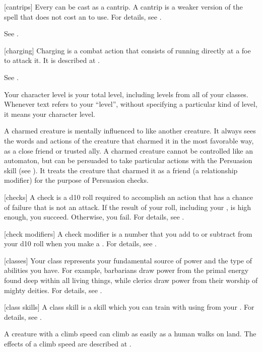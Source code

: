 [cantrips] Every  can be cast as a cantrip.
A cantrip is a weaker version of the spell that does not cost an  to use.
For details, see .

 See .

[charging] Charging is a combat action that consists of running directly at a foe to attack it.
It is described at .

 See .

 Your character level is your total level, including levels from all of your classes.
Whenever text refers to your ``level'', without specifying a particular kind of level, it means your character level.

 A charmed creature is mentally influenced to like another creature.
It always sees the words and actions of the creature that charmed it in the most favorable way, as a close friend or trusted ally.
A charmed creature cannot be controlled like an automaton, but can be persuaded to take particular actions with the Persuasion skill (see ).
It treats the creature that charmed it as a friend (a  relationship modifier) for the purpose of Persuasion checks.

[checks] A check is a d10 roll required to accomplish an action that has a chance of failure that is not an attack.
If the result of your roll, including your , is high enough, you succeed.
Otherwise, you fail.
For details, see .

[check modifiers] A check modifier is a number that you add to or subtract from your d10 roll when you make a .
For details, see .

[classes] Your class represents your fundamental source of power and the type of abilities you have.
For example, barbarians draw power from the primal energy found deep within all living things, while clerics draw power from their worship of mighty deities.
For details, see .

[class skills] A class skill is a skill which you can train with using  from your . For details, see .

 A creature with a climb speed can climb as easily as a human walks on land.
The effects of a climb speed are described at .

